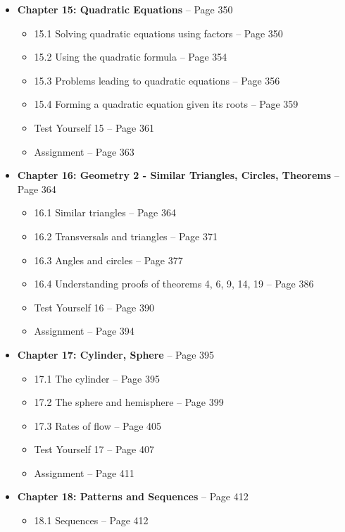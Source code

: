 \documentclass{article}
\begin{document}
\begin{itemize}
\begin{itemize}
        \end{itemize}
    \item \textbf{Chapter 15: Quadratic Equations} -- Page 350
        \begin{itemize}
            \item 15.1 Solving quadratic equations using factors -- Page 350
            \item 15.2 Using the quadratic formula -- Page 354
            \item 15.3 Problems leading to quadratic equations -- Page 356
            \item 15.4 Forming a quadratic equation given its roots -- Page 359
            \item Test Yourself 15 -- Page 361
            \item Assignment -- Page 363
        \end{itemize}
    \item \textbf{Chapter 16: Geometry 2 - Similar Triangles, Circles, Theorems} -- Page 364
        \begin{itemize}
            \item 16.1 Similar triangles -- Page 364
            \item 16.2 Transversals and triangles -- Page 371
            \item 16.3 Angles and circles -- Page 377
            \item 16.4 Understanding proofs of theorems 4, 6, 9, 14, 19 -- Page 386
            \item Test Yourself 16 -- Page 390
            \item Assignment -- Page 394
        \end{itemize}
    \item \textbf{Chapter 17: Cylinder, Sphere} -- Page 395
        \begin{itemize}
            \item 17.1 The cylinder -- Page 395
            \item 17.2 The sphere and hemisphere -- Page 399
            \item 17.3 Rates of flow -- Page 405
            \item Test Yourself 17 -- Page 407
            \item Assignment -- Page 411
        \end{itemize}
    \item \textbf{Chapter 18: Patterns and Sequences} -- Page 412
        \begin{itemize}
            \item 18.1 Sequences -- Page 412

\end{itemize}
\end{itemize}
\end{document}
